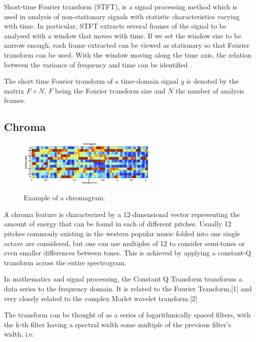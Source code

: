 Short-time Fourier transform (STFT), is a signal processing method which is used in analysis of non-stationary signals with statistic characteristics varying with time.
In particular, STFT extracts several frames of the signal to be analysed with a window that moves with time. If we set the window size to be narrow enough, each frame extracted can be viewed as stationary so that Fourier transform can be used. With the window moving along the time axis, the relation between the variance of frequency and time can be identified \cite{STFT}.

The short time Fourier transform of a time-domain signal $y$ is denoted by the matrix $F \times N$, $F$ being the Fourier transform size and $N$ the number of analysis frames.

\vspace{10pt}

\subsection{Chroma}

\begin{figure}       
      \centering
                \includegraphics[width=0.6\textwidth]{Figures/chromagram_example}
			   \vspace{20pt}
			   \label{fig:chromaexample}
			   \caption{Example of a chromagram.}
\end{figure}

A chroma feature is characterized by a 12-dimensional vector representing the amount of energy that can be found in each of different pitches. Usually 12 pitches commonly existing in the western popular music folded into one single octave are considered, but one can use multiples of 12 to consider semi-tones or even smaller differences between tones. This is achieved by applying a constant-Q transform across the entire spectrogram. 

In mathematics and signal processing, the Constant Q Transform transforms a data series to the frequency domain. It is related to the Fourier Transform,[1] and very closely related to the complex Morlet wavelet transform.[2]

The transform can be thought of as a series of logarithmically spaced filters, with the k-th filter having a spectral width some multiple of the previous filter's width, i.e.

